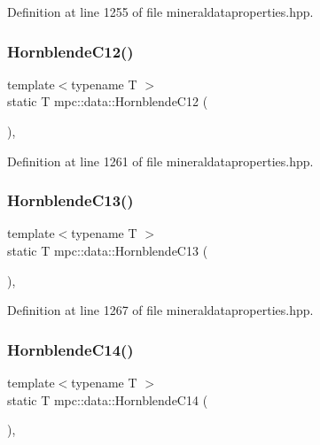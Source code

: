 Definition at line 1255 of file mineraldataproperties.\+hpp.

\mbox{\label{namespacempc_1_1data_afa7c10ac7c2225e827b8a63413e06f53}} 
\subsubsection{\texorpdfstring{Hornblende\+C12()}{HornblendeC12()}}
{\footnotesize\ttfamily template$<$typename T $>$ \\
static T mpc\+::data\+::\+Hornblende\+C12 (\begin{DoxyParamCaption}{ }\end{DoxyParamCaption})\hspace{0.3cm}{\ttfamily [inline]}, {\ttfamily [static]}}



Definition at line 1261 of file mineraldataproperties.\+hpp.

\mbox{\label{namespacempc_1_1data_a55fdd151be94a96ade5cbb7acae92a75}} 
\subsubsection{\texorpdfstring{Hornblende\+C13()}{HornblendeC13()}}
{\footnotesize\ttfamily template$<$typename T $>$ \\
static T mpc\+::data\+::\+Hornblende\+C13 (\begin{DoxyParamCaption}{ }\end{DoxyParamCaption})\hspace{0.3cm}{\ttfamily [inline]}, {\ttfamily [static]}}



Definition at line 1267 of file mineraldataproperties.\+hpp.

\mbox{\label{namespacempc_1_1data_abecf15ecd895997f681e0651de7a662c}} 
\subsubsection{\texorpdfstring{Hornblende\+C14()}{HornblendeC14()}}
{\footnotesize\ttfamily template$<$typename T $>$ \\
static T mpc\+::data\+::\+Hornblende\+C14 (\begin{DoxyParamCaption}{ }\end{DoxyParamCaption})\hspace{0.3cm}{\ttfamily [inline]}, {\ttfamily [static]}}



